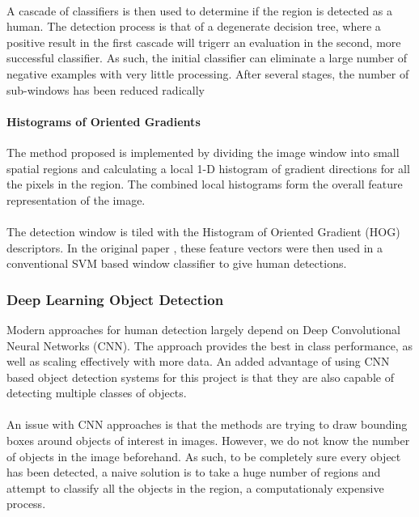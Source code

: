 \paragraph{}A cascade of classifiers is then used to determine if the region is detected as a human. The detection process is that of a degenerate decision tree, where a positive result in the first cascade will trigerr an evaluation in the second, more successful classifier. As such, the initial classifier can eliminate a large number of negative examples with very little processing. After several stages, the number of sub-windows has been reduced radically

\paragraph{Histograms of Oriented Gradients}
The method proposed is implemented by dividing the image window into small spatial regions and calculating a local 1-D histogram of gradient directions for all the pixels in the region. The combined local histograms form the overall feature representation of the image.

\paragraph{}The detection window is tiled with the Histogram of Oriented Gradient (HOG) descriptors. In the original paper \cite{Dalal2005}, these feature vectors were then used in a conventional SVM based window classifier  to give human detections.

\subsubsection{Deep Learning Object Detection}
Modern approaches for human detection largely depend on Deep Convolutional Neural Networks (CNN). The approach provides the best in class performance, as well as scaling effectively with more data. An added advantage of using CNN based object detection systems for this project is that they are also capable of detecting multiple classes of objects.

\paragraph{}An issue with CNN approaches is that the methods are trying to draw bounding boxes around objects of interest in images. However, we do not know the number of objects in the image beforehand. As such, to be completely sure every object has been detected, a naive solution is to take a huge number of regions and attempt to classify all the objects in the region, a computationaly expensive process.

